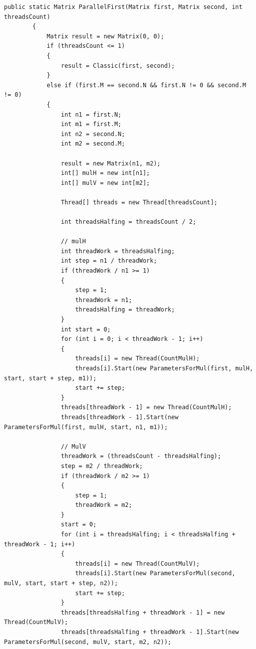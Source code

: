\documentclass{article}
\begin{document}
	\begin{lstlisting}[label=firstParallelLst,caption=Первый вариант распараллеливания алгоритм Винограда]
public static Matrix ParallelFirst(Matrix first, Matrix second, int threadsCount)
        {
            Matrix result = new Matrix(0, 0);
            if (threadsCount <= 1)
            {
                result = Classic(first, second);
            }
            else if (first.M == second.N && first.N != 0 && second.M != 0)
            {
                int n1 = first.N;
                int m1 = first.M;
                int n2 = second.N;
                int m2 = second.M;

                result = new Matrix(n1, m2);
                int[] mulH = new int[n1];
                int[] mulV = new int[m2];

                Thread[] threads = new Thread[threadsCount];

                int threadsHalfing = threadsCount / 2;

                // mulH
                int threadWork = threadsHalfing;
                int step = n1 / threadWork;
                if (threadWork / n1 >= 1)
                {
                    step = 1;
                    threadWork = n1;
                    threadsHalfing = threadWork;
                }
                int start = 0;
                for (int i = 0; i < threadWork - 1; i++)
                {
                    threads[i] = new Thread(CountMulH);
                    threads[i].Start(new ParametersForMul(first, mulH, start, start + step, m1));
                    start += step;
                }
                threads[threadWork - 1] = new Thread(CountMulH);
                threads[threadWork - 1].Start(new ParametersForMul(first, mulH, start, n1, m1));

                // MulV
                threadWork = (threadsCount - threadsHalfing);
                step = m2 / threadWork;
                if (threadWork / m2 >= 1)
                {
                    step = 1;
                    threadWork = m2;
                }
                start = 0;
                for (int i = threadsHalfing; i < threadsHalfing + threadWork - 1; i++)
                {
                    threads[i] = new Thread(CountMulV);
                    threads[i].Start(new ParametersForMul(second, mulV, start, start + step, n2));
                    start += step;
                }
                threads[threadsHalfing + threadWork - 1] = new Thread(CountMulV);
                threads[threadsHalfing + threadWork - 1].Start(new ParametersForMul(second, mulV, start, m2, n2));


\end{lstlisting}
\end{document}
